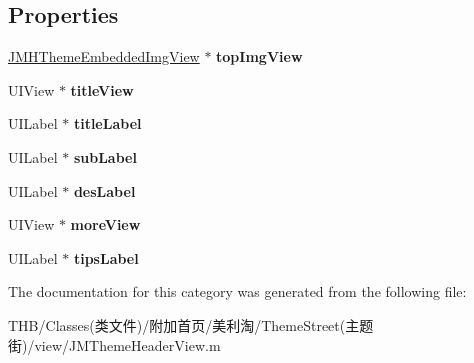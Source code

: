 \subsection*{Properties}
\begin{DoxyCompactItemize}
\item 
\mbox{\label{category_j_m_theme_header_view_07_08_a596b0cee2f8597ae3af58dd82093e45c}} 
\mbox{\hyperlink{interface_j_m_h_theme_embedded_img_view}{J\+M\+H\+Theme\+Embedded\+Img\+View}} $\ast$ {\bfseries top\+Img\+View}
\item 
\mbox{\label{category_j_m_theme_header_view_07_08_a51307aabfd6aa8be4ce3684803ca6ddf}} 
U\+I\+View $\ast$ {\bfseries title\+View}
\item 
\mbox{\label{category_j_m_theme_header_view_07_08_a1b0f7c3a7896248cd5f39d18022bdc29}} 
U\+I\+Label $\ast$ {\bfseries title\+Label}
\item 
\mbox{\label{category_j_m_theme_header_view_07_08_a0d13db8e3da622b94d57b21f25384c4e}} 
U\+I\+Label $\ast$ {\bfseries sub\+Label}
\item 
\mbox{\label{category_j_m_theme_header_view_07_08_a220cbbfbfafc0618a843db461c1f299e}} 
U\+I\+Label $\ast$ {\bfseries des\+Label}
\item 
\mbox{\label{category_j_m_theme_header_view_07_08_a86a07622f633d154dafc63d149d5b0e6}} 
U\+I\+View $\ast$ {\bfseries more\+View}
\item 
\mbox{\label{category_j_m_theme_header_view_07_08_a31b585a2a80bfbf90ba1fa88d02f43ec}} 
U\+I\+Label $\ast$ {\bfseries tips\+Label}
\end{DoxyCompactItemize}


The documentation for this category was generated from the following file\+:\begin{DoxyCompactItemize}
\item 
T\+H\+B/\+Classes(类文件)/附加首页/美利淘/\+Theme\+Street(主题街)/view/J\+M\+Theme\+Header\+View.\+m\end{DoxyCompactItemize}
